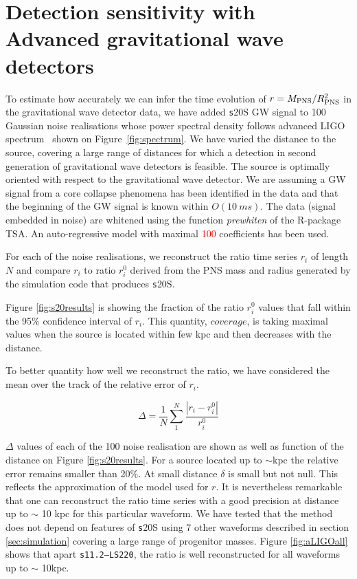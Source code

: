 \section{Detection sensitivity with Advanced gravitational wave detectors}
\label{sec:results}

To estimate how accurately we can infer the time evolution of $r=M_{\rm PNS}/R_{\rm PNS}^2$ in the
gravitational wave detector data, we have added {\texttt s20S} GW signal to 
100 Gaussian noise realisations whose power spectral density follows advanced LIGO
spectrum~\cite{aLIGOsens:2018} shown on Figure~\ref{fig:spectrum}. 
We have varied the distance to the source, covering a large
range of distances for which a detection in second generation of gravitational wave detectors
is feasible. The source is optimally oriented with
respect to the gravitational wave detector. We are assuming a GW signal from a core collapse
phenomena has been identified in the data and that the beginning of the GW signal is known within $O(10~ms)$.
The data (signal embedded in noise) are whitened using the function {\it prewhiten} of the R-package TSA.
An auto-regressive model with maximal \textcolor{red}{100} coefficients has been used.    

For each of the noise realisations, we reconstruct the ratio time series {$r_i$}
of length $N$ and compare {$r_i$} to ratio {$r_i^0$} derived from
the PNS mass and radius generated by the simulation code that produces {\texttt s20S}.

Figure \ref{fig:s20results} is showing the fraction of the ratio {$r_i^0$} values that fall
within the 95\% confidence interval of {$r_i$}. This quantity, $coverage$, is taking maximal values
when the source is located within few kpc and then decreases with the distance.

To better quantity how well we reconstruct the ratio, we have considered the mean over the track
of the relative error of $r_i$. 

\begin{equation}
\Delta=\frac{1}{N}\sum_1^N\frac{|r_i-r_i^0|}{r_i^0}
\end{equation}

$\Delta$ values of each of the 100 noise realisation are shown as well as function of the distance
on Figure \ref{fig:s20results}. For a source located up to $\sim$\unit[10]{kpc} the relative error
remains smaller than 20\%. At small distance $\delta$ is small but not null. This reflects the
approximation of the model used for $r$.
It is nevertheless remarkable that one can reconstruct the ratio time series with a good
precision at distance up to $\sim$ 10 kpc for this particular waveform. We have tested
that the method does not depend on features of {\texttt s20S} using 7 other waveforms
described in section \ref{sec:simulation} covering a large range of progenitor masses.
Figure \ref{fig:aLIGOall} shows that apart {\tt s11.2--LS220}, the ratio is well
reconstructed for all waveforms up to $\sim$ 10kpc. 

